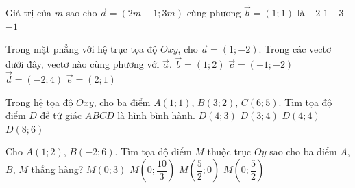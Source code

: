 

\begin{ex}%
	Giá trị của $m$ sao cho $\overrightarrow{a}=(2m-1;3m)$ cùng phương  $\overrightarrow{b}=(1;1)$ là
	 \choice
		 {$-2$}
		{$1$} 
		{$-3$} 
		{\True  $-1$}
\end{ex}

\begin{ex}%
	Trong mặt phẳng với hệ trục tọa độ $Oxy$, cho $\overrightarrow{a}=(1;-2)$. Trong các vectơ dưới đây, vectơ nào cùng phương  với $\overrightarrow{a}$.
	\choice 
		 {$\overrightarrow{b}=(1; 2)$}
		{$\overrightarrow{c}=(-1;-2)$} 
		 {\True $\overrightarrow{d}=(-2; 4)$}
		 {$\overrightarrow{e}=(2; 1)$}
\end{ex}

\begin{ex}%
	Trong hệ tọa độ $Oxy$, cho ba điểm $A(1;1)$, $B(3;2)$, $C(6;5)$. Tìm tọa độ điểm $D$ để tứ giác $ABCD$  là hình bình hành.
	 \choice
		{$D(4;3)$} 
		{$D(3;4)$} 
		{\True  $D(4;4)$}
		 {$D(8;6)$}
\end{ex}

\begin{ex}%
	Cho $A(1;2)$, $B(-2;6)$. Tìm tọa độ điểm $M$ thuộc trục $Oy$ sao cho ba điểm $A$, $B$, $M$ thẳng hàng? 
	\choice 
		 {$M(0;3)$}
		 {\True $M\left(0;\dfrac{10}{3}\right)$}
		 {$M\left(\dfrac{5}{2};0\right)$}
		 {$M\left(0;\dfrac{5}{2}\right)$}
\end{ex}

